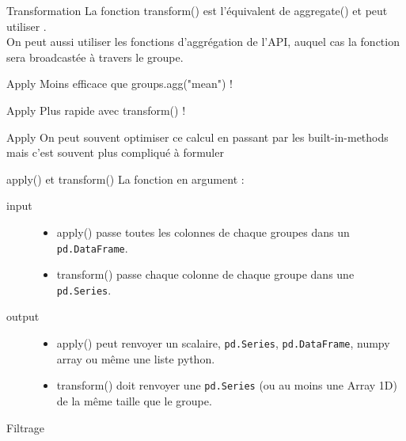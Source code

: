 \begin{frame}{Transformation}
  La fonction transform() est l'équivalent de aggregate() et peut utiliser   . \\
  On peut aussi utiliser les fonctions d'aggrégation de l'API, auquel cas la fonction sera broadcastée à travers le groupe.
\end{frame}

\begin{frame}{Apply}
  Moins efficace que groups.agg("mean") !
\end{frame}

\begin{frame}{Apply}
  Plus rapide avec transform() !
\end{frame}

\begin{frame}{Apply}
  On peut souvent optimiser ce calcul en passant par les built-in-methods mais c'est souvent plus compliqué à formuler \\
\end{frame}

\begin{frame}{apply() et transform()}
  La fonction en argument :
  \begin{description}
    \item[input]  \begin{itemize}
                    \item apply() passe toutes les colonnes de chaque groupes dans un \texttt{pd.DataFrame}.
                    \item transform() passe chaque colonne de chaque groupe dans une \texttt{pd.Series}.
                  \end{itemize}
    \item[output]  \begin{itemize}
                    \item apply() peut renvoyer un scalaire, \texttt{pd.Series}, \texttt{pd.DataFrame}, numpy array ou même une liste python.
                    \item transform() doit renvoyer une \texttt{pd.Series} (ou au moins une Array 1D) de la même taille que le groupe.
                  \end{itemize}
  \end{description}
\end{frame}

\begin{frame}{Filtrage}
\end{frame}
